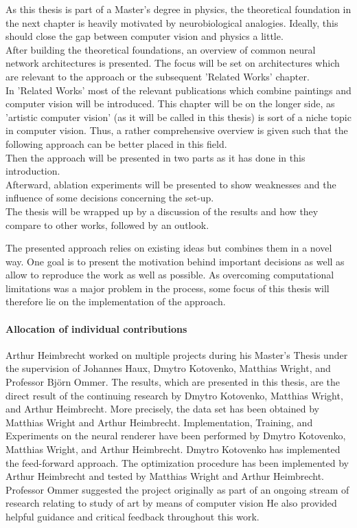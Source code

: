 As this thesis is part of a Master's degree in physics, the theoretical foundation in the next chapter is heavily motivated by neurobiological analogies.
Ideally, this should close the gap between computer vision and physics a little.\\
After building the theoretical foundations, an overview of common neural network architectures is presented.
The focus will be set on architectures which are relevant to the approach or the subsequent 'Related Works' chapter.\\
In 'Related Works' most of the relevant publications which combine paintings and computer vision will be introduced.
This chapter will be on the longer side, as 'artistic computer vision' (as it will be called in this thesis) is sort of a niche topic in computer vision.
Thus, a rather comprehensive overview is given such that the following approach can be better placed in this field.\\
Then the approach will be presented in two parts as it has done in this introduction. \\
Afterward, ablation experiments will be presented to show weaknesses and the influence of some decisions concerning the set-up.\\
The thesis will be wrapped up by a discussion of the results and how they compare to other works, followed by an outlook.

The presented approach relies on existing ideas but combines them in a novel way.
One goal is to present the motivation behind important decisions as well as allow to reproduce the work as well as possible.
As overcoming computational limitations was a major problem in the process, some focus of this thesis will therefore lie on the implementation of the approach.

\paragraph{Allocation of individual contributions}
Arthur Heimbrecht worked on multiple projects during his Master's Thesis under the supervision of Johannes Haux, Dmytro Kotovenko, Matthias Wright, and Professor Björn Ommer.
The results, which are presented in this thesis, are the direct result of the continuing research by Dmytro Kotovenko, Matthias Wright, and Arthur Heimbrecht.
More precisely, the data set has been obtained by Matthias Wright and Arthur Heimbrecht.
Implementation, Training, and Experiments on the neural renderer have been performed by Dmytro Kotovenko, Matthias Wright, and Arthur Heimbrecht.
Dmytro Kotovenko has implemented the feed-forward approach.
The optimization procedure has been implemented by Arthur Heimbrecht and tested by Matthias Wright and Arthur Heimbrecht.
Professor Ommer suggested the project originally as part of an ongoing stream of research relating to study of art by means of computer vision
He also provided helpful guidance and critical feedback throughout this work.
